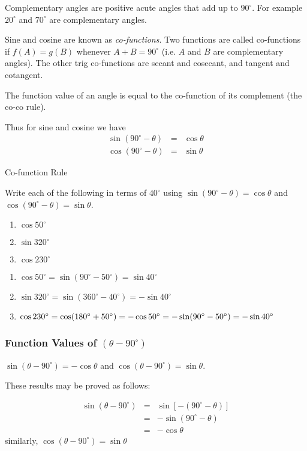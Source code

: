 Complementary angles are positive acute angles that add up to $90^\circ$. For example $20^\circ$ and $70^\circ$ are complementary angles.

Sine and cosine are known as \emph{co-functions}. Two functions are called co-functions if $f(A)=g(B)$ whenever $A+B = 90^{\circ}$ (i.e. $A$ and $B$ are complementary angles). The other trig co-functions are secant and cosecant, and tangent and cotangent.

The function value of an angle is equal to the co-function of its complement (the co-co rule). 

Thus for sine and cosine we have
\begin{eqnarray*}
 \sin (90^\circ-\theta) &=& \cos\theta \\
 \cos (90^\circ-\theta) &=& \sin\theta
\end{eqnarray*}

\begin{wex}{Co-function Rule}
{%
Write each of the following in terms of $40^{\circ}$ using $\sin (90^{\circ}-\theta)=\cos \theta$ and $\cos (90^{\circ}-\theta)=\sin \theta$. \begin{enumerate} \item $\cos 50^{\circ}$ \item $\sin 320^{\circ}$ \item $\cos 230^{\circ}$ \end{enumerate}
}%
{%
\begin{enumerate}
\item $\cos 50^{\circ}=\sin (90^{\circ}-50^{\circ}) = \sin 40^{\circ}$
\item $\sin 320^{\circ} = \sin (360^{\circ}-40^{\circ}) = -\sin 40^{\circ}$
\item $\cos 230^{\circ} =\cos (180^{\circ}+50^{\circ}) = -\cos 50^{\circ} \newline = -\sin (90^{\circ} - 50^{\circ}) = -\sin 40^{\circ}$
\end{enumerate}
}%
\end{wex}

\subsubsection{Function Values of $(\theta - 90^\circ)$}

$\sin(\theta - 90^\circ) = -\cos\theta$ and $\cos(\theta - 90^\circ) = \sin\theta$.

These results may be proved as follows:

\begin{eqnarray*}
\sin(\theta - 90^\circ)& =&\sin[-(90^\circ - \theta)]\\
&=& -\sin(90^\circ - \theta)\\
&=&-\cos\theta
\end{eqnarray*}
similarly, $\cos(\theta - 90^\circ) = \sin\theta$

